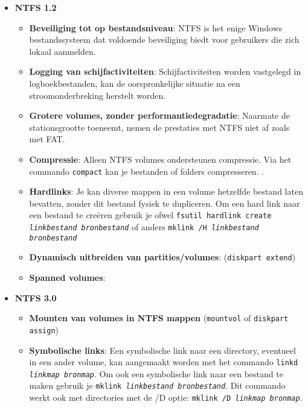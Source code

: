 \begin{enumerate}
		 {
			\begin{itemize}
				\item \textbf{NTFS 1.2}
					\begin{itemize}
						\item \textbf{Beveiliging tot op bestandsniveau}: NTFS is het enige Windows bestandssysteem dat voldoende beveiliging biedt voor gebruikers die zich lokaal aanmelden.
						\item \textbf{Logging van schijfactiviteiten}: Schijfactiviteiten worden vastgelegd in logboekbestanden, kan de oorspronkelijke situatie na een stroomonderbreking herstelt worden.
						\item \textbf{Grotere volumes, zonder performantiedegradatie}: Naarmate de stationsgrootte toeneemt, nemen de prestaties met NTFS niet af zoals met FAT.
						\item \textbf{Compressie}: Alleen NTFS volumes ondersteunen compressie. Via het commando \texttt{compact} kan je bestanden of folders compresseren. .
						\item \textbf{Hardlinks}: Je kan diverse mappen in een volume hetzelfde bestand laten bevatten, zonder dit bestand fysiek te dupliceren. Om een hard link naar een bestand te creëren gebruik je ofwel \texttt{fsutil hardlink create \emph{linkbestand} \emph{bronbestand}} of anders \texttt{mklink /H \emph{linkbestand} \emph{bronbestand}}
						\item \textbf{Dynamisch uitbreiden van partities/volumes}: (\texttt{diskpart extend})
						\item \textbf{Spanned volumes}: 
					\end{itemize}
				\item \textbf{NTFS 3.0}
					\begin{itemize}
						\item \textbf{Mounten van volumes in NTFS mappen} (\texttt{mountvol} of \texttt{diskpart assign})
						\item \textbf{Symbolische links}: Een symbolische link naar een directory, eventueel in een ander volume, kan aangemaakt worden met het commando \texttt{linkd \emph{linkmap} \emph{bronmap}}. Om ook een symbolische link naar een bestand te maken gebruik je \texttt{mklink \emph{linkbestand} \emph{bronbestand}}. Dit commando werkt ook met directories met de /D optie: \texttt{mklink /D \emph{linkmap} \emph{bronmap}}.

\end{itemize}
\end{itemize}}
\end{enumerate}
